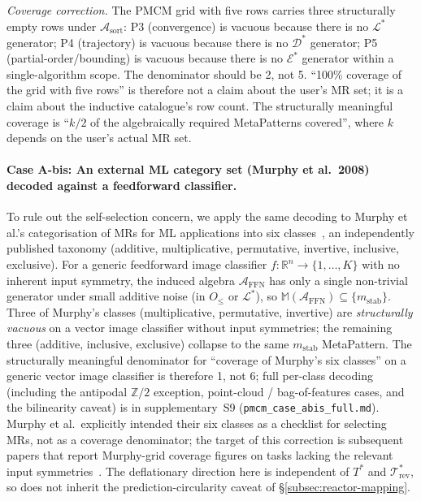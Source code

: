 \documentclass[acmsmall,screen,review]{acmart}
\begin{document}
\noindent \emph{Coverage correction.} The PMCM grid with five rows carries three structurally empty rows under $\mathcal{A}_{\mathrm{sort}}$: P3 (convergence) is vacuous because there is no $\mathcal{L}^{*}$ generator; P4 (trajectory) is vacuous because there is no $\mathcal{D}^{*}$ generator; P5 (partial-order/bounding) is vacuous because there is no $\mathcal{E}^{*}$ generator within a single-algorithm scope. The denominator should be 2, not 5. ``100\% coverage of the grid with five rows'' is therefore not a claim about the user's MR set; it is a claim about the inductive catalogue's row count. The structurally meaningful coverage is ``$k/2$ of the algebraically required MetaPatterns covered'', where $k$ depends on the user's actual MR set.

\paragraph{Case A-bis: An external ML category set (Murphy et al.\ 2008) decoded against a feedforward classifier.}
\label{para:case-a-bis}
To rule out the self-selection concern, we apply the same decoding to Murphy et al.'s categorisation of MRs for ML applications into six classes~\cite{Murphy2008, Xie2011, Saha2019SupervisedMR}, an independently published taxonomy (additive, multiplicative, permutative, invertive, inclusive, exclusive). For a generic feedforward image classifier $f: \mathbb{R}^{n} \to \{1, \dots, K\}$ with no inherent input symmetry, the induced algebra $\mathcal{A}_{\mathrm{FFN}}$ has only a single non-trivial generator under small additive noise (in $O_{\le}$ or $\mathcal{L}^{*}$), so $\mathbb{M}(\mathcal{A}_{\mathrm{FFN}}) \subseteq \{m_{\mathrm{stab}}\}$. Three of Murphy's classes (multiplicative, permutative, invertive) are \emph{structurally vacuous} on a vector image classifier without input symmetries; the remaining three (additive, inclusive, exclusive) collapse to the same $m_{\mathrm{stab}}$ MetaPattern. The structurally meaningful denominator for ``coverage of Murphy's six classes'' on a generic vector image classifier is therefore 1, not 6; full per-class decoding (including the antipodal $\mathbb{Z}/2$ exception, point-cloud / bag-of-features cases, and the bilinearity caveat) is in supplementary~S9 (\texttt{pmcm\_case\_abis\_full.md}). Murphy et al.\ explicitly intended their six classes as a checklist for selecting MRs, not as a coverage denominator; the target of this correction is subsequent papers that report Murphy-grid coverage figures on tasks lacking the relevant input symmetries~\cite{Saha2019SupervisedMR}. The deflationary direction here is independent of $T^{*}$ and $\mathcal{T}^{*}_{\mathrm{rev}}$, so does not inherit the prediction-circularity caveat of \S\ref{subsec:reactor-mapping}.
\end{document}
